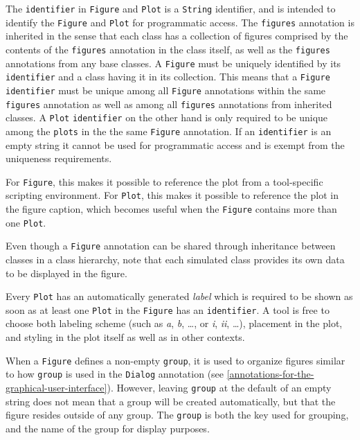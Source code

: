 The \lstinline!identifier! in \lstinline!Figure! and \lstinline!Plot! is a \lstinline!String! identifier, and is intended to identify the \lstinline!Figure! and \lstinline!Plot! for programmatic access.
The \lstinline!figures! annotation is inherited in the sense that each class has a collection of figures comprised by the contents of the \lstinline!figures! annotation in the class itself, as well as the \lstinline!figures! annotations from any base classes.
A \lstinline!Figure! must be uniquely identified by its \lstinline!identifier! and a class having it in its collection.
This means that a \lstinline!Figure! \lstinline!identifier! must be unique among all \lstinline!Figure! annotations within the same \lstinline!figures! annotation as well as among all \lstinline!figures! annotations from inherited classes.
A \lstinline!Plot! \lstinline!identifier! on the other hand is only required to be unique among the \lstinline!plots! in the the same \lstinline!Figure! annotation.
If an \lstinline!identifier! is an empty string it cannot be used for programmatic access and is exempt from the uniqueness requirements.

\begin{nonnormative}
For \lstinline!Figure!, this makes it possible to reference the plot from a tool-specific scripting environment.
For \lstinline!Plot!, this makes it possible to reference the plot in the figure caption, which becomes useful when the \lstinline!Figure! contains more than one \lstinline!Plot!.
\end{nonnormative}

Even though a \lstinline!Figure! annotation can be shared through inheritance between classes in a class hierarchy, note that each simulated class provides its own data to be displayed in the figure.

Every \lstinline!Plot! has an automatically generated \emph{label} which is required to be shown as soon as at least one \lstinline!Plot! in the \lstinline!Figure! has an \lstinline!identifier!.
A tool is free to choose both labeling scheme (such as \emph{a}, \emph{b}, \dots, or \emph{i}, \emph{ii}, \dots), placement in the plot, and styling in the plot itself as well as in other contexts.

When a \lstinline!Figure! defines a non-empty \lstinline!group!, it is used to organize figures similar to how \lstinline!group! is used in the \lstinline!Dialog! annotation (see \cref{annotations-for-the-graphical-user-interface}).
However, leaving \lstinline!group! at the default of an empty string does not mean that a group will be created automatically, but that the figure resides outside of any group.
The \lstinline!group! is both the key used for grouping, and the name of the group for display purposes.

